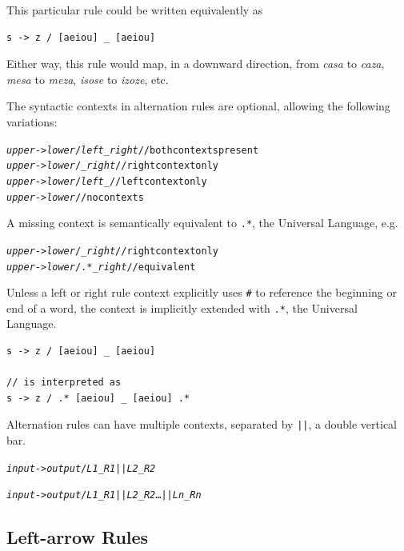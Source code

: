 \noindent
This particular rule could be written equivalently as


\begin{Verbatim}
s -> z / [aeiou] _ [aeiou]
\end{Verbatim}

\noindent
Either way, this rule would map, in a downward direction, from \emph{casa} to \emph{caza}, \emph{mesa} to \emph{meza},
\emph{isose} to \emph{izoze}, etc.

The syntactic contexts in alternation rules are optional, allowing the following variations:

\begin{alltt}
\emph{upper} -> \emph{lower} /   \emph{left} _ \emph{right} // both contexts present
\emph{upper} -> \emph{lower} /   _ \emph{right}    // right context only
\emph{upper} -> \emph{lower} /   \emph{left} _     // left context only
\emph{upper} -> \emph{lower}               // no contexts
\end{alltt}

\noindent
A missing context is semantically equivalent to \verb!.*!, the Universal Language, e.g.

\begin{alltt}
\emph{upper} -> \emph{lower} /    _ \emph{right}	    // right context only
\emph{upper} -> \emph{lower} / .* _ \emph{right}	    // equivalent
\end{alltt}

Unless a left or right rule context explicitly uses \verb!#! to reference the
beginning or end of a word, the context is implicitly extended with
\verb!.*!, the Universal Language.

\begin{Verbatim}
s -> z / [aeiou] _ [aeiou]

// is interpreted as
s -> z / .* [aeiou] _ [aeiou] .*
\end{Verbatim}



Alternation rules can have multiple contexts, separated by \texttt{||}, a double vertical bar.

\begin{alltt}
\emph{input} -> \emph{output} / \emph{L1} _ \emph{R1} || \emph{L2} _ \emph{R2}

\emph{input} -> \emph{output} / \emph{L1} _ \emph{R1} || \emph{L2} _ \emph{R2} \ldots || \emph{Ln} _ \emph{Rn}
\end{alltt}

\subsection{Left-arrow Rules}

